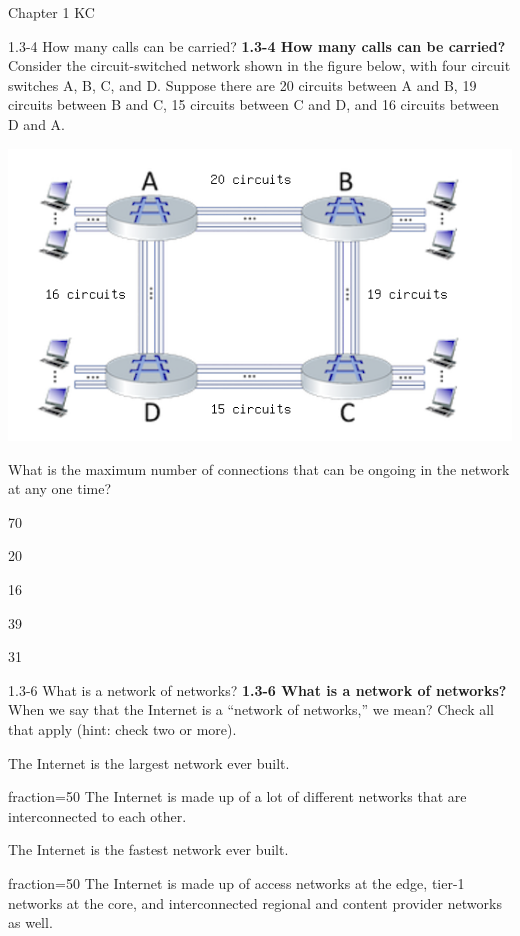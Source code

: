 \documentclass[a4paper]{article}
\begin{document}
\begin{quiz}{Chapter 1 KC}
\begin{multi}[points=1]{1.3-4 How many calls can be carried?}
\textbf{1.3-4 How many calls can be carried?} 
Consider the circuit-switched network shown in the figure below, with four circuit switches A, B, C, and D. Suppose there are 20 circuits between A and B, 19 circuits between B and C, 15 circuits between C and D, and 16 circuits between D and A. 
\begin{center}
\includegraphics[width=\linewidth]{figs/1.3.4.png}
\end{center}
 What is the maximum number of connections that can be ongoing in the network at any one time?
\item* 70
\item 20
\item 16
\item 39
\item 31
\end{multi}

\begin{multi}[points=1,multiple]{1.3-6 What is a network of networks?}
\textbf{1.3-6 What is a network of networks?}  
When we say that the Internet is a ``network of networks,'' we mean? Check all that apply (hint: check two or more).
\item The Internet is the largest network ever built.
\item[fraction=50] The Internet is made up of a lot of different networks that are interconnected to each other.
\item The Internet is the fastest network ever built.
\item[fraction=50] The Internet is made up of access networks at the edge, tier-1 networks at the core, and interconnected regional and content provider networks as well.
\end{multi}


\end{quiz}
\end{document}
